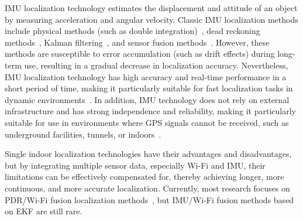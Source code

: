 \documentclass[12pt,a4paper]{article}
\numberwithin{equation}{section}
\begin{document}
IMU localization technology estimates the displacement and attitude of an object
by measuring acceleration and angular velocity. Classic IMU localization methods
include physical methods (such as double integration)~\cite{yan2018ridi}, dead
reckoning methods~\cite{jirawimut2003method}, Kalman
filtering~\cite{caron2006gps}, and sensor fusion
methods~\cite{dehzangi2017imu}. However, these methods are susceptible to error
accumulation (such as drift effects) during long-term use, resulting in a
gradual decrease in localization accuracy. Nevertheless, IMU localization
technology has high accuracy and real-time performance in a short period of
time, making it particularly suitable for fast localization tasks in dynamic
environments~\cite{marins2001improved}. In addition, IMU technology does not
rely on external infrastructure and has strong independence and reliability,
making it particularly suitable for use in environments where GPS signals cannot
be received, such as underground facilities, tunnels, or
indoors~\cite{wu2015indoor}.

Single indoor localization technologies have their advantages and disadvantages,
but by integrating multiple sensor data, especially Wi-Fi and IMU, their
limitations can be effectively compensated for, thereby achieving longer, more
continuous, and more accurate localization. Currently, most research focuses on
PDR/Wi-Fi fusion localization methods~\cite{liu2021kalman}, but IMU/Wi-Fi fusion
methods based on EKF are still rare.
\end{document}
